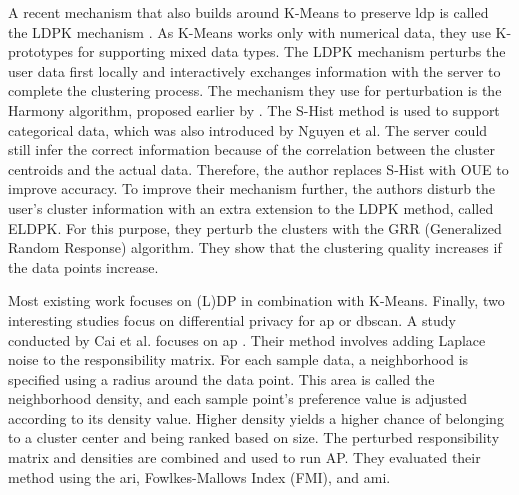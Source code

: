 A recent mechanism that also builds around K-Means to preserve \gls{ldp} is called the LDPK mechanism \citep{yuan_privacypreserving_2021}.
As K-Means works only with numerical data, they use K-prototypes for supporting mixed data types.
The LDPK mechanism perturbs the user data first locally and interactively exchanges information with the server to complete the clustering process.
The mechanism they use for perturbation is the Harmony algorithm, proposed earlier by \citep{nguyen_collecting_2016}.
The S-Hist method is used to support categorical data, which was also introduced by Nguyen et al.
The server could still infer the correct information because of the correlation between the cluster centroids and the actual data.
Therefore, the author replaces S-Hist with OUE \citep{wang_locally_nodate} to improve accuracy.
To improve their mechanism further, the authors disturb the user’s cluster information with an extra extension to the LDPK method, called ELDPK.
For this purpose, they perturb the clusters with the GRR (Generalized Random Response) algorithm.
They show that the clustering quality increases if the data points increase. \newline

Most existing work focuses on (L)DP in combination with K-Means.
Finally, two interesting studies focus on differential privacy for \gls{ap} or \gls{dbscan}.
A study conducted by Cai et al. focuses on \gls{ap} \citep{cai_dp-ap_2020}.
Their method involves adding Laplace noise to the responsibility matrix.
For each sample data, a neighborhood is specified using a radius around the data point.
This area is called the neighborhood density, and each sample point’s preference value is adjusted according to its density value.
Higher density yields a higher chance of belonging to a cluster center and being ranked based on size.
The perturbed responsibility matrix and densities are combined and used to run AP.
They evaluated their method using the  \gls{ari}, Fowlkes-Mallows Index (FMI), and \gls{ami}.

